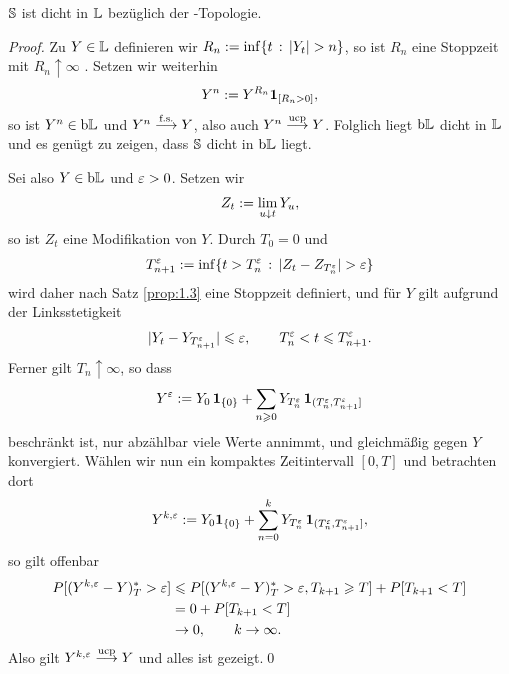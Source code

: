 \begin{theorem}
\label{prop:2.7}
$\S$ ist dicht in $\L$ bezüglich der \ucp-Topologie.\fish
\end{theorem}
\begin{proof}
Zu $Y\in \L$ definieren wir $R_n \defl \inf\setdef{t}{\abs{Y_t} > n}$, so ist
$R_n$ eine Stoppzeit mit $R_n\uparrow \infty$ \fs. Setzen wir weiterhin
\begin{align*}
Y^n \defl Y^{R_n}\Id_{[R_n> 0]},
\end{align*}
so ist $Y^n\in \bL$ und $Y^n\fsto Y$, also auch $Y^n\ucpto Y$. Folglich liegt
$\bL$ dicht in $\L$ und es genügt zu zeigen, dass $\S$ dicht in $\bL$ liegt.


Sei also $Y\in \bL$ und $\ep > 0$. Setzen wir
\begin{align*}
Z_t \defl \lim\limits_{u\downarrow t} Y_u,
\end{align*}
so ist $Z_t$ eine \cadlag Modifikation von $Y$. Durch $T_0 = 0$ und 
\begin{align*}
T_{n+1}^\ep \defl \inf\setdef{t > T_n^\ep}{\abs{Z_t-Z_{T_n^\ep}} > \ep}
\end{align*}
wird daher nach Satz \ref{prop:1.3} eine Stoppzeit  definiert, und für $Y$ gilt
aufgrund der Linksstetigkeit
\begin{align*}
\abs{Y_t - Y_{T_{n+1}^\ep}} \le \ep,\qquad T_n^\ep < t\le T_{n+1}^\ep.
\end{align*}
Ferner gilt $T_n\uparrow \infty$, so dass
\begin{align*}
Y^\ep \defl Y_0 \,\Id_{\setd{0}} +  \sum_{n\ge 0}
Y_{T_n^\ep}\,\Id_{(T_n^\ep,T_{n+1}^\ep]}
\end{align*}
beschränkt ist, nur abzählbar viele Werte annimmt, und gleichmäßig gegen $Y$
konvergiert. Wählen wir nun ein kompaktes Zeitintervall $[0,T]$ und
betrachten dort
\begin{align*}
Y^{k,\ep} \defl 
Y_0 \Id_{\setd{0}} +  \sum_{n= 0}^k
Y_{T_n^\ep}\,\Id_{(T_n^\ep,T_{n+1}^\ep]},
\end{align*}
so gilt offenbar
\begin{align*}
P[(Y^{k,\ep}-Y)_T^* > \ep]
&\le
P[(Y^{k,\ep}-Y)_T^* > \ep,T_{k+1} \ge T]
+
P[T_{k+1} < T] \\
&= 0 + P[T_{k+1} < T]\\
&\to 0,\qquad k\to \infty.
\end{align*}
Also gilt $Y^{k,\ep} \ucpto Y$ und alles ist gezeigt.\qed
\end{proof}

